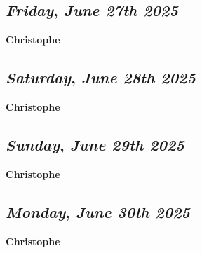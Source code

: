 \def\day{\textit{June 27th 2025}}
\def\weekday{\textit{Friday}}
\subsection*{\weekday, \day}
\textbf {Christophe}

\def\day{\textit{June 28th 2025}}
\def\weekday{\textit{Saturday}}
\subsection*{\weekday, \day}
\textbf {Christophe}

\def\day{\textit{June 29th 2025}}
\def\weekday{\textit{Sunday}}
\subsection*{\weekday, \day}
\textbf {Christophe}

\def\day{\textit{June 30th 2025}}
\def\weekday{\textit{Monday}}
\subsection*{\weekday, \day}
\textbf {Christophe}

